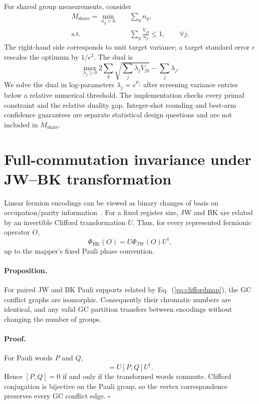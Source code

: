 \documentclass[aps,pra,twocolumn,superscriptaddress,nofootinbib,floatfix]{revtex4-2}
\newcommand{\Mshare}{M_{\mathrm{share}}}
\begin{document}
For shared group measurements, consider
\begin{align}
 \Mshare=\min_{n_g>0}\quad &\sum_g n_g,\\
 \text{s.t.}\quad &\sum_g\frac{V_{jg}}{n_g}\le 1,\qquad \forall j.
 \label{eq:mshare}
\end{align}
The right-hand side corresponds to unit target variance; a target standard error $\epsilon$ rescales the optimum by $1/\epsilon^2$. The dual is
\begin{equation}
 \max_{\lambda_j\ge0}
 2\sum_g\sqrt{\sum_j\lambda_jV_{jg}}-\sum_j\lambda_j.
 \label{eq:dual}
\end{equation}
We solve the dual in log-parameters $\lambda_j=e^{\mu_j}$ after screening variance entries below a relative numerical threshold. The implementation checks every primal constraint and the relative duality gap. Integer-shot rounding and best-arm confidence guarantees are separate statistical design questions and are not included in $\Mshare$.

\section{Full-commutation invariance under JW--BK transformation}

Linear fermion encodings can be viewed as binary changes of basis on occupation/parity information~\cite{chiew2024ternary,chiew2025optimal}. For a fixed register size, JW and BK are related by an invertible Clifford transformation $U$. Thus, for every represented fermionic operator $O$,
\begin{equation}
 \Phi_{\mathrm{BK}}(O)=U\Phi_{\mathrm{JW}}(O)U^\dagger,
 \label{eq:cliffordmap}
\end{equation}
up to the mapper's fixed Pauli phase convention.

\paragraph{Proposition.}
For paired JW and BK Pauli supports related by Eq.~(\ref{eq:cliffordmap}), the GC conflict graphs are isomorphic. Consequently their chromatic numbers are identical, and any valid GC partition transfers between encodings without changing the number of groups.

\paragraph{Proof.}
For Pauli words $P$ and $Q$,
\begin{equation}
 [UPU^\dagger,UQU^\dagger]=U[P,Q]U^\dagger.
\end{equation}
Hence $[P,Q]=0$ if and only if the transformed words commute. Clifford conjugation is bijective on the Pauli group, so the vertex correspondence preserves every GC conflict edge. \hfill$\square$
\end{document}

